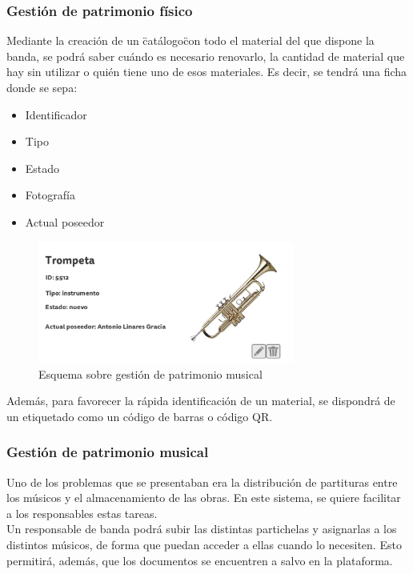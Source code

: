 \documentclass[11pt,spanish]{article}
\begin{document}
\subsubsection{Gestión de patrimonio físico}
Mediante la creación de un \"catálogo\" con todo el material del que dispone la banda,
se podrá saber cuándo es necesario renovarlo, la cantidad de material que hay sin utilizar
o quién tiene uno de esos materiales. Es decir, se tendrá una ficha donde se sepa:

\begin{itemize}
  \item Identificador
  \item Tipo
  \item Estado
  \item Fotografía
  \item Actual poseedor
\end{itemize}

\begin{figure}[!h]
\centering
\includegraphics[width=0.75\textwidth]{img/patrimoniofisico.jpg}
\caption{Esquema sobre gestión de patrimonio musical}
\end{figure}

Además, para favorecer la rápida identificación de un material, se
dispondrá de un etiquetado como un código de barras o código QR.


\subsubsection{Gestión de patrimonio musical}
Uno de los problemas que se presentaban era la distribución de partituras entre los
músicos y el almacenamiento de las obras. En este sistema, se quiere facilitar a los
responsables estas tareas.\\
Un responsable de banda podrá subir las distintas partichelas y asignarlas a los
distintos músicos, de forma que puedan acceder a ellas cuando lo necesiten. Esto
permitirá, además, que los documentos se encuentren a salvo en la plataforma.
\end{document}
